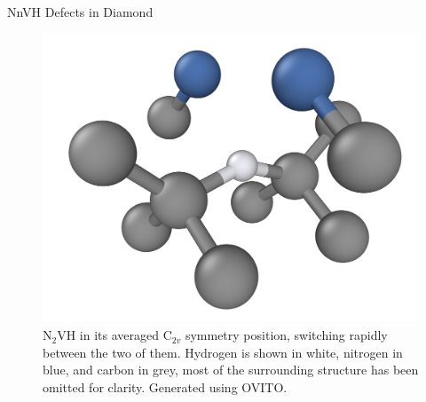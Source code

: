 \documentclass[final]{beamer}
\newlength{\colwidth}
\begin{document}
\begin{frame}[t]
\begin{columns}[t]
\begin{column}{\colwidth}
\begin{block}{NnVH Defects in Diamond}
    
    \begin{figure}
      \centering
        \includegraphics[width=\textwidth]{n2vh_coloured.png}
      \caption{N$_2$VH in its averaged C$_{2v}$ symmetry position, switching rapidly between the two of them. Hydrogen is shown in white, nitrogen in blue, and carbon in grey, most of the surrounding structure has been omitted for clarity. Generated using OVITO.}
    \end{figure}



  \end{block}


\end{column}
\end{columns}
\end{frame}
\end{document}
